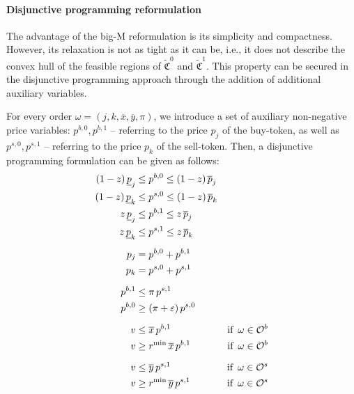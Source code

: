 \documentclass[11pt,parskip=full]{scrartcl}%
\newcommand*{\ie}{i.e., }
\newcommand*{\Min}{\mathrm{min}}
\newcommand*{\buyorders}{\mathcal{O}^b}     %
\newcommand*{\sellorders}{\mathcal{O}^s}    %
\begin{document}
\paragraph{Disjunctive programming reformulation}

The advantage of the big-M reformulation is its simplicity and compactness.
However, its relaxation is not as tight as it can be, \ie it does not describe the convex hull of
the feasible regions of $ \tilde{\mathfrak{C}}^0 $ and $ \tilde{\mathfrak{C}}^1 $.
This property can be secured in the disjunctive programming approach through the addition of
additional auxiliary variables.

For every order $ \omega = (j,k,\overline{x},\overline{y},\pi) $, we introduce a set of auxiliary
non-negative price variables:
$ p^{b,0}, p^{b,1} $ -- referring to the price $ p_j $ of the buy-token, as well as
$ p^{s,0}, p^{s,1} $ -- referring to the price $ p_k $ of the sell-token.
Then, a disjunctive programming formulation can be given as follows:
\begin{subequations}
\begin{align}
  (1-z) \, \underline{p}_j &\le p^{b,0} \le (1-z) \, \overline{p}_j
    \label{eq:mip1_dp_buyprice_0}\\
  (1-z) \, \underline{p}_k &\le p^{s,0} \le (1-z) \, \overline{p}_k
    \label{eq:mip1_dp_sellprice_0}\\
  z \, \underline{p}_j &\le p^{b,1} \le z \, \overline{p}_j
    \label{eq:mip1_dp_buyprice_1}\\
  z \, \underline{p}_k &\le p^{s,1} \le z \, \overline{p}_k
    \label{eq:mip1_dp_sellprice_1}\\[2mm]
  p_j &= p^{b,0} + p^{b,1}
    \label{eq:mip1_dp_buyprice_aggr}\\
  p_k &= p^{s,0} + p^{s,1}
    \label{eq:mip1_dp_sellprice_aggr}\\[2mm]
  p^{b,1} &\le \pi \, p^{s,1}
    \label{eq:mip1_dp_xrate_1}\\
  p^{b,0} &\ge (\pi+\varepsilon) \, p^{s,0}
    \label{eq:mip1_dp_xrate_0}\\[2mm]
  v &\le \overline{x} \, p^{b,1} &\text{if} \enskip \omega \in \buyorders
    \label{eq:mip1_dp_volume_buy_ub}\\
  v &\ge r^\Min \, \overline{x} \, p^{b,1} &\text{if} \enskip \omega \in \buyorders
    \label{eq:mip1_dp_volume_buy_lb}\\[2mm]
  v &\le \overline{y} \, p^{s,1} &\text{if} \enskip \omega \in \sellorders
    \label{eq:mip1_dp_volume_sell_ub}\\
  v &\ge r^\Min \, \overline{y} \, p^{s,1} &\text{if} \enskip \omega \in \sellorders
    \label{eq:mip1_dp_volume_sell_lb}
\end{align}
\end{subequations}
\end{document}
